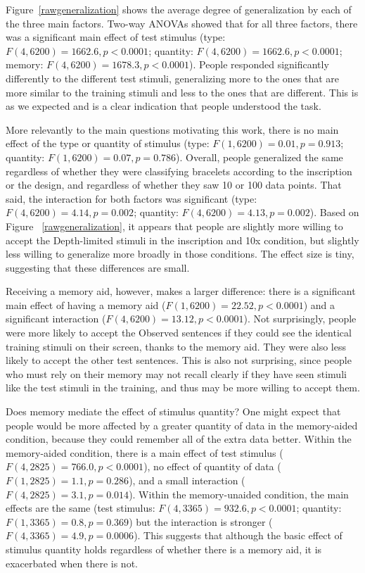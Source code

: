 \documentclass[10pt,letterpaper]{article}
\begin{document}
Figure~\ref{rawgeneralization} shows the average degree of generalization by each of the three main factors. Two-way ANOVAs showed that for all three factors, there was a significant main effect of test stimulus ({\sc type}: $F(4,6200)=1662.6, p<0.0001$; {\sc quantity}: $F(4,6200)=1662.6, p<0.0001$; {\sc memory}: $F(4,6200)=1678.3, p<0.0001$). People responded significantly differently to the different test stimuli, generalizing more to the ones that are more similar to the training stimuli and less to the ones that are different. This is as we expected and is a clear indication that people understood the task.

More relevantly to the main questions motivating this work, there is no main effect of the type or quantity of stimulus ({\sc type}: $F(1,6200)=0.01, p=0.913$; {\sc quantity}: $F(1,6200)=0.07, p=0.786$). Overall, people generalized the same regardless of whether they were classifying bracelets according to the {\sc inscription} or the {\sc design}, and regardless of whether they saw 10 or 100 data points. That said, the interaction for both factors was significant ({\sc type}: $F(4,6200)=4.14, p=0.002$; {\sc quantity}: $F(4,6200)=4.13, p=0.002$). Based on Figure ~\ref{rawgeneralization}, it appears that people are slightly more willing to accept the \textsf{Depth-limited} stimuli in the {\sc inscription} and {\sc 10x} condition, but slightly less willing to generalize more broadly in those conditions. The effect size is tiny, suggesting that these differences are small.

Receiving a memory aid, however, makes a larger difference: there is a significant main effect of having a memory aid ($F(1,6200)=22.52, p<0.0001$) and a significant interaction ($F(4,6200)=13.12, p<0.0001$). Not surprisingly, people were more likely to accept the \textsf{Observed} sentences if they could see the identical training stimuli on their screen, thanks to the memory aid. They were also less likely to accept the other test sentences. This is also not surprising, since people who must rely on their memory may not recall clearly if they have seen stimuli like the test stimuli in the training, and thus may be more willing to accept them.

Does memory mediate the effect of stimulus quantity? One might expect that people would be more affected by a greater quantity of data in the {\sc memory-aided} condition, because they could remember all of the extra data better. Within the {\sc memory-aided} condition, there is a main effect of test stimulus ($F(4,2825)=766.0, p<0.0001$), no effect of quantity of data ($F(1,2825)=1.1, p=0.286$), and a small interaction ($F(4,2825)=3.1, p=0.014$). Within the {\sc memory-unaided} condition, the main effects are the same (test stimulus: $F(4,3365)=932.6, p<0.0001$; quantity: $F(1,3365)=0.8, p=0.369$) but the interaction is stronger ($F(4,3365)=4.9, p=0.0006$). This suggests that although the basic effect of stimulus quantity holds regardless of whether there is a memory aid, it is exacerbated when there is not. 
\end{document}
